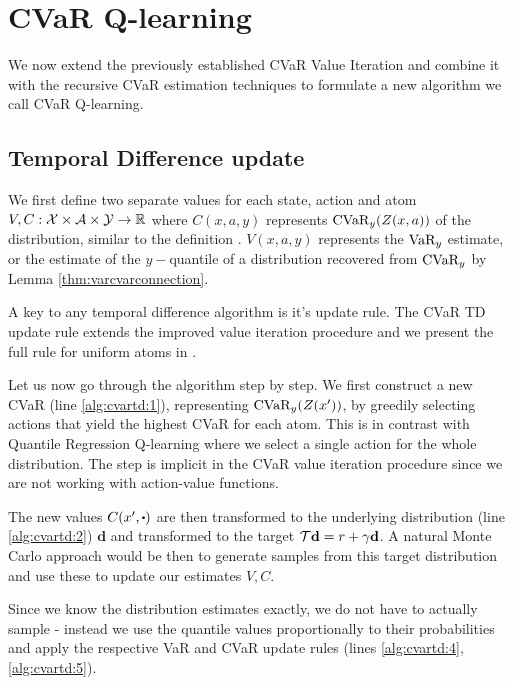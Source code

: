 \section{CVaR Q-learning}\label{sec:qcvar}

We now extend the previously established CVaR Value Iteration and combine it with the recursive CVaR estimation techniques to formulate a new algorithm we call CVaR Q-learning.

\subsection{Temporal Difference update}
We first define two separate values for each state, action and atom $V, C: \mathcal{X}\times\mathcal{A}\times\mathcal{Y}\to\mathbb{R}$ where $C(x, a, y)$ represents $\text{CVaR}_y(Z(x, a))$ of the distribution, similar to the definition . $V(x, a, y)$ represents the $\text{VaR}_y$ estimate, or the estimate of the $y-$quantile of a distribution recovered from $\text{CVaR}_y$ by Lemma \ref{thm:varcvarconnection}.

A key to any temporal difference algorithm is it's update rule. The CVaR TD update rule extends the improved value iteration procedure and we present the full rule for uniform atoms in . 

Let us now go through the algorithm step by step. We first construct a new CVaR (line \ref{alg:cvartd:1}), representing $\text{CVaR}_y(Z(x'))$, by greedily selecting actions that yield the highest CVaR for each atom. This is in contrast with Quantile Regression Q-learning where we select a single action for the whole distribution.
The step is implicit in the CVaR value iteration procedure since we are not working with action-value functions. 

The new values $C(x', \bigcdot)$ are then transformed to the underlying distribution (line \ref{alg:cvartd:2}) $\mathbf{d}$ and transformed to the target $\mathcal{T} \mathbf{d} = r + \gamma \mathbf{d}$. A natural Monte Carlo approach would be then to generate samples from this target distribution and use these to update our estimates $V, C$.

Since we know the distribution estimates exactly, we do not have to actually sample - instead we use the quantile values proportionally to their probabilities and apply the respective VaR and CVaR update rules (lines \ref{alg:cvartd:4}, \ref{alg:cvartd:5}).


